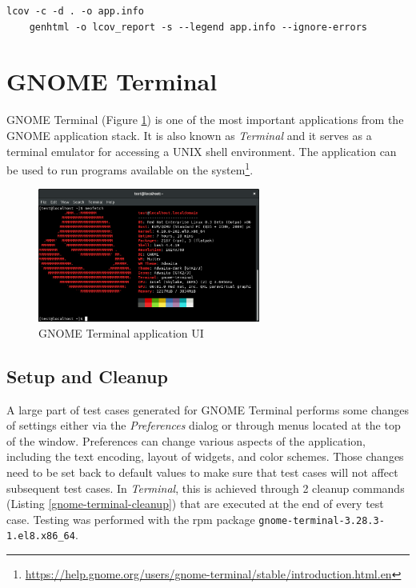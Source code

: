 \begin{lstlisting}[language=Gherkin,caption={Shell commands used to generate an HTML report with the \texttt{lcov} tool},label={lcov_report}]
    lcov -c -d . -o app.info
    genhtml -o lcov_report -s --legend app.info --ignore-errors
\end{lstlisting}


\section{GNOME Terminal}\label{terminal}
GNOME Terminal (Figure \ref{terminal-gui}) is one of the most important applications from the GNOME application stack. It is also known as \textit{Terminal} and it serves as a terminal emulator for accessing a UNIX shell environment. The application can be used to run programs available on the system\footnote{\url{https://help.gnome.org/users/gnome-terminal/stable/introduction.html.en}}. 

\begin{figure}[H]
	\centering
	\includegraphics[width=0.65\textwidth,clip]{obrazky-figures/gnome-terminal-ui.png}
	\caption{GNOME Terminal application UI}
	\label{terminal-gui}
\end{figure}

\subsection*{Setup and Cleanup}
A large part of test cases generated for GNOME Terminal performs some changes of settings either via the \textit{Preferences} dialog or through menus located at the top of the window. Preferences can change various aspects of the application, including the text encoding, layout of widgets, and color schemes. Those changes need to be set back to default values to make sure that test cases will not affect subsequent test cases. In \textit{Terminal}, this is achieved through 2 cleanup commands (Listing \ref{gnome-terminal-cleanup}) that are executed at the end of every test case. Testing was performed with the rpm package \texttt{gnome-terminal-3.28.3-1.el8.x86\_64}.

